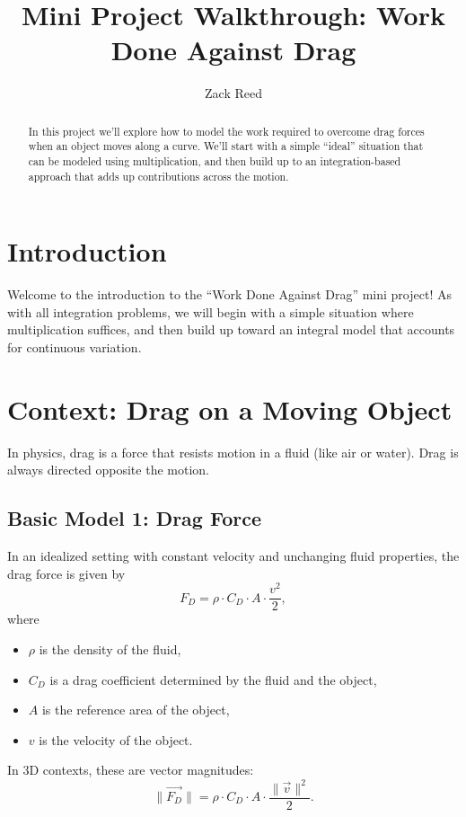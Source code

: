 \documentclass{ximera}
\title{Mini Project Walkthrough: Work Done Against Drag}
\author{Zack Reed}
\begin{document}
\begin{abstract}
In this project we'll explore how to model the work required to overcome drag forces when an object moves along a curve. We'll start with a simple ``ideal'' situation that can be modeled using multiplication, and then build up to an integration-based approach that adds up contributions across the motion.
\end{abstract}
\maketitle

\section*{Introduction}

Welcome to the introduction to the ``Work Done Against Drag'' mini project!  
As with all integration problems, we will begin with a simple situation where multiplication suffices, and then build up toward an integral model that accounts for continuous variation.

\section*{Context: Drag on a Moving Object}

In physics, drag is a force that resists motion in a fluid (like air or water). Drag is always directed opposite the motion.

\subsection*{Basic Model 1: Drag Force}

In an idealized setting with constant velocity and unchanging fluid properties, the drag force is given by
\[
F_D = \rho \cdot C_D \cdot A \cdot \frac{v^2}{2},
\]
where
\begin{itemize}
\item $\rho$ is the density of the fluid,
\item $C_D$ is a drag coefficient determined by the fluid and the object,
\item $A$ is the reference area of the object,
\item $v$ is the velocity of the object.
\end{itemize}

In 3D contexts, these are vector magnitudes:
\[
\|\vec{F_D}\| = \rho \cdot C_D \cdot A \cdot \frac{\|\vec{v}\|^2}{2}.
\]
\end{document}
